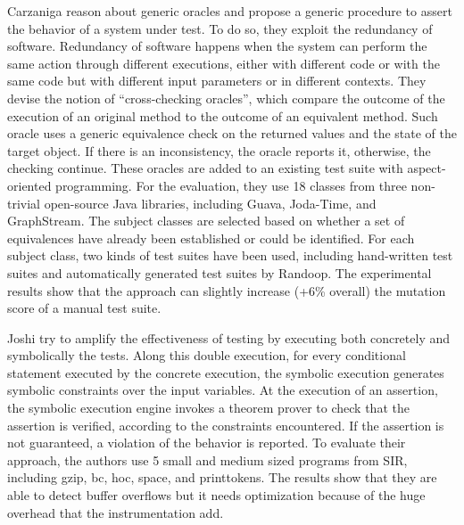 Carzaniga \etal\cite{Carzaniga:2014:COI:2568225.2568287} reason about generic oracles and propose a generic procedure to assert the behavior of a system under test. 
To do so, they exploit the redundancy of software. 
Redundancy of software happens when the system can perform the same action through different executions, either with different code or with the same code but with different input parameters or in different contexts. They devise the notion of ``cross-checking oracles'', which compare the outcome of the execution of an original method to the outcome of an equivalent method. Such oracle uses a generic equivalence check on the returned values and the state of the target object. If there is an inconsistency, the oracle reports it, otherwise, the checking continue. These oracles are added to an existing test suite with aspect-oriented programming. For the evaluation, they use 18 classes from three non-trivial open-source Java libraries, including Guava, Joda-Time, and GraphStream. The subject classes are selected based on whether a set of equivalences have already been established or could be identified. For each subject class, two kinds of test suites have been used, including hand-written test suites and automatically generated test suites by Randoop. The experimental results show that the approach can slightly increase (+6\% overall) the mutation score of a manual test suite.

Joshi \etal\cite{Joshi07} try to amplify the effectiveness of testing by executing both concretely and symbolically the tests. 
Along this double execution, for every conditional statement executed by the concrete execution, the symbolic execution generates symbolic constraints over the input variables. 
At the execution of an assertion, the symbolic execution engine invokes a theorem prover to check that the assertion is verified, according to the constraints encountered. 
If the assertion is not guaranteed, a violation of the behavior is reported. 
To evaluate their approach, the authors use 5 small and medium sized programs from SIR, including gzip, bc, hoc, space, and printtokens. 
The results show that they are able to detect buffer overflows but it needs optimization because of the huge overhead that the instrumentation add.

